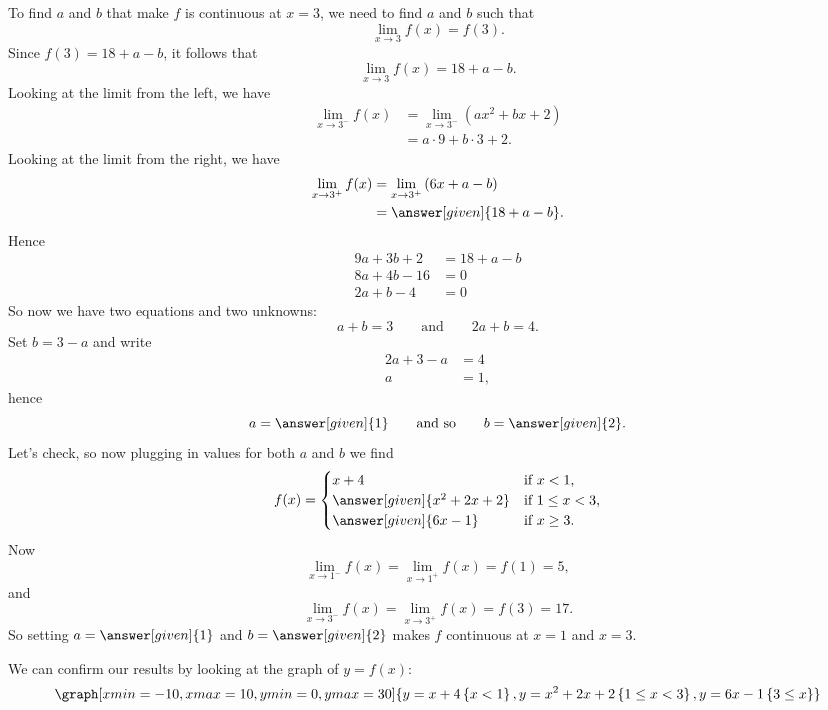 \documentclass{ximera}
\begin{document}
\begin{example}
\begin{explanation}
To find $a$ and $b$ that make $f$ is continuous at $x=3$, we need to
find $a$ and $b$ such that
\[
\lim_{x\to 3} f(x) =f(3).
\]
Since $f(3)=18+a-b$, it follows that 
\[
\lim_{x\to 3} f(x) =18+a-b.
\]
Looking at the limit from the left, we have
\begin{align*}
  \lim_{x\to 3^-} f(x) &= \lim_{x\to 3^-} \left(ax^2+bx+2\right) \\
  &=a\cdot 9 + b\cdot 3 + 2.
\end{align*}
Looking at the limit from the right, we have
\begin{align*}
  \lim_{x\to 3^+} f(x) &= \lim_{x\to 3^+} \left(6x+a-b\right) \\
  &= \answer[given]{18+a-b}.
\end{align*}
Hence 
\begin{align*}
  9a + 3b + 2 &= 18+a-b\\
  8a + 4b -16 &= 0\\
  2a + b -4 &= 0
\end{align*}
So now we have two equations and two unknowns:
\[
 a+b=3 \qquad\text{and}\qquad 2a + b  = 4.
 \]
 Set $b = 3-a$ and write
 \begin{align*}
   2a+3-a&=4 \\
  a &= 1,
 \end{align*}
 hence
 \[
 a=\answer[given]{1}\qquad\text{and so}\qquad b =\answer[given]{2}.
 \]
 Let's check, so now plugging in values for both $a$ and $b$ we find
 \[
 f(x) = 
 \begin{cases}
   x+4 &\text{if $x<1$,}\\
   \answer[given]{x^2+2x+2} &\text{if $1\le x< 3$,}\\
   \answer[given]{6x-1} &\text{if $x\ge 3$.}
\end{cases}
 \]
 Now
 \[
 \lim_{x\to 1^-} f(x) =\lim_{x\to 1^+}f(x) =f(1) =  5,
 \]
 and
 \[
 \lim_{x\to 3^-} f(x) =\lim_{x\to 3^+}f(x) =f(3) = 17.  
 \]
 So setting $a= \answer[given]{1}$ and $b=\answer[given]{2}$ makes $f$ continuous at $x=1$ and $x=3$.
 \begin{onlineOnly}
   We can confirm our results by looking at the graph of $y=f(x)$:
   \[
   \graph[xmin=-10,xmax=10,ymin=0,ymax=30]{y=x+4\left\{x<1\right\},y=x^2+2x+2\left\{1\leq x<3\right\},y=6x-1\left\{3 \leq x\right\}} 
   \]
 \end{onlineOnly}
\end{explanation}
\end{example}
\end{document}
